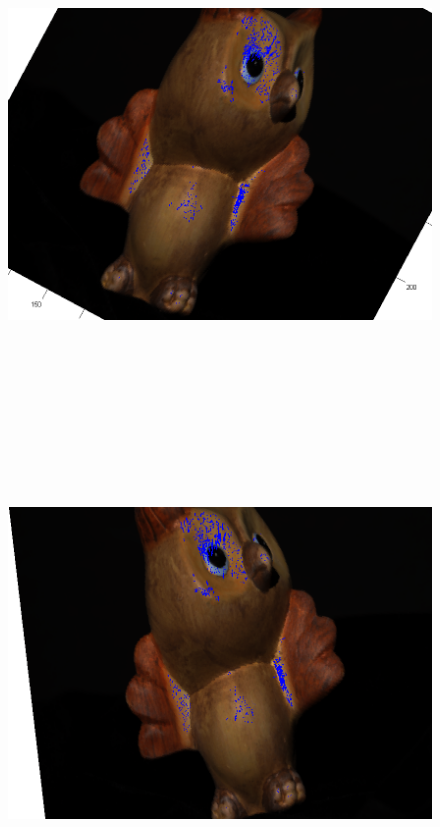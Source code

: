 \documentclass[11pt,psfig]{article}
\begin{document}
\begin{figure}[H]
\centering
\includegraphics[height=5in]{prob4needlePlot2.png}
\end{figure}
\begin{figure}[H]
\centering
\includegraphics[height=5in]{prob4needlePlot3.png}
\end{figure}
\end{document}
